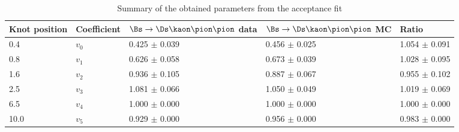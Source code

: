 \begin{table}[h]
\centering
\caption{Summary of the obtained parameters from the acceptance fit} 
\begin{tabular}{l l l l l}
\hline
\hline
Knot position & Coefficient & $\Bs\to\Ds\kaon\pion\pion$ data & $\Bs\to\Ds\kaon\pion\pion$ MC & Ratio \\
\hline
0.4 & $v_{0}$ & 0.425 $\pm$ 0.039 & 0.456 $\pm$ 0.025 & 1.054 $\pm$ 0.091\\
0.8 & $v_{1}$ & 0.626 $\pm$ 0.058 & 0.673 $\pm$ 0.039 & 1.028 $\pm$ 0.095\\
1.6 & $v_{2}$ & 0.936 $\pm$ 0.105 & 0.887 $\pm$ 0.067 & 0.955 $\pm$ 0.102\\
2.5 & $v_{3}$ & 1.081 $\pm$ 0.066 & 1.050 $\pm$ 0.049 & 1.019 $\pm$ 0.069\\
6.5 & $v_{4}$ & 1.000 $\pm$ 0.000 & 1.000 $\pm$ 0.000 & 1.000 $\pm$ 0.000\\
10.0 & $v_{5}$ & 0.929 $\pm$ 0.000 & 0.956 $\pm$ 0.000 & 0.983 $\pm$ 0.000\\
\hline
\hline
\end{tabular}
\label{table:splines}
\end{table}
